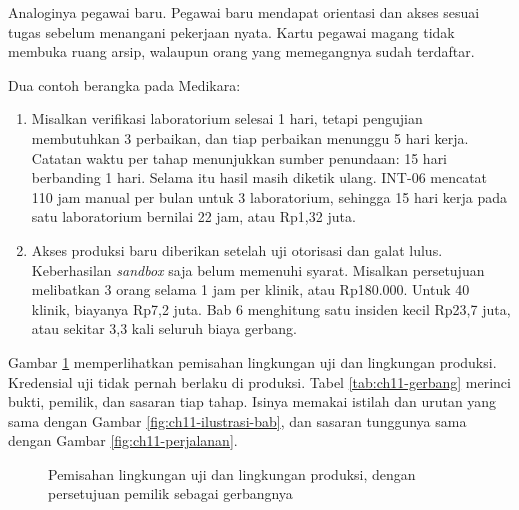Analoginya pegawai baru. Pegawai baru mendapat orientasi dan akses sesuai tugas sebelum menangani pekerjaan nyata. Kartu pegawai magang
tidak membuka ruang arsip, walaupun orang yang memegangnya sudah terdaftar.

Dua contoh berangka pada Medikara:
\begin{enumerate}
  \item Misalkan verifikasi laboratorium selesai 1 hari, tetapi pengujian membutuhkan 3 perbaikan, dan tiap perbaikan menunggu 5 hari
        kerja. Catatan waktu per tahap menunjukkan sumber penundaan: 15 hari berbanding 1 hari. Selama itu hasil masih diketik ulang.
        INT-06 mencatat 110 jam manual per bulan untuk 3 laboratorium, sehingga 15 hari kerja pada satu laboratorium bernilai 22 jam,
        atau Rp1,32 juta.
  \item Akses produksi baru diberikan setelah uji otorisasi dan galat lulus. Keberhasilan \textit{sandbox} saja belum memenuhi syarat.
        Misalkan persetujuan melibatkan 3 orang selama 1 jam per klinik, atau Rp180.000. Untuk 40 klinik, biayanya Rp7,2 juta. Bab 6
        menghitung satu insiden kecil Rp23,7 juta, atau sekitar 3,3 kali seluruh biaya gerbang.
\end{enumerate}

Gambar \ref{fig:ch11-gerbang} memperlihatkan pemisahan lingkungan uji dan lingkungan produksi. Kredensial uji tidak pernah berlaku di
produksi. Tabel \ref{tab:ch11-gerbang} merinci bukti, pemilik, dan sasaran tiap tahap. Isinya memakai istilah dan urutan yang sama dengan
Gambar \ref{fig:ch11-ilustrasi-bab}, dan sasaran tunggunya sama dengan Gambar \ref{fig:ch11-perjalanan}.

\begin{figure}[!htb]
  \centering
  
  \caption{Pemisahan lingkungan uji dan lingkungan produksi, dengan persetujuan pemilik sebagai gerbangnya}
  \label{fig:ch11-gerbang}
\end{figure}

